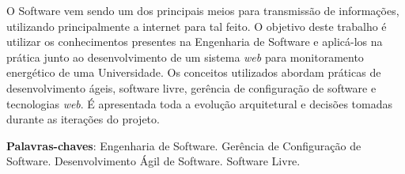 \begin{resumo}
 O Software vem sendo um dos principais meios para transmissão de informações, utilizando principalmente a internet para tal feito. O objetivo deste trabalho é utilizar os conhecimentos presentes na Engenharia de Software e aplicá-los na prática junto ao desenvolvimento de um sistema \textit{web} para monitoramento energético de uma Universidade. Os conceitos utilizados abordam práticas de desenvolvimento ágeis, software livre, gerência de configuração de software e tecnologias \textit{web}. É apresentada toda a evolução arquitetural e decisões tomadas durante as iterações do projeto.

 \vspace{\onelineskip}
    
 \noindent
 \textbf{Palavras-chaves}: Engenharia de Software. Gerência de Configuração de Software. Desenvolvimento Ágil de Software. Software Livre.
\end{resumo}
